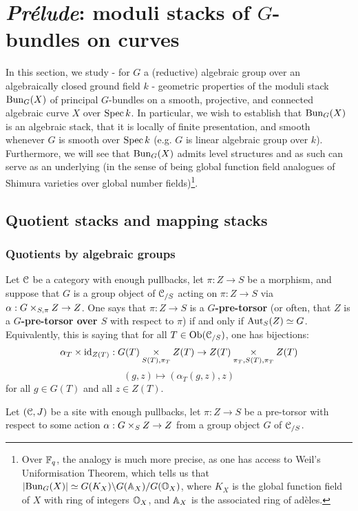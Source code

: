 \section{\textit{Pr\'elude}: moduli stacks of \texorpdfstring{$G$}{}-bundles on curves}
    In this section, we study - for $G$ a (reductive) algebraic group over an algebraically closed ground field $k$ - geometric properties of the moduli stack $\mathrm{Bun}_G(X)$ of principal $G$-bundles on a smooth, projective, and connected algebraic curve $X$ over $\operatorname{Spec} k$. In particular, we wish to establish that $\mathrm{Bun}_G(X)$ is an algebraic stack, that it is locally of finite presentation, and smooth whenever $G$ is smooth over $\operatorname{Spec} k$ (e.g. $G$ is linear algebraic group over $k$). Furthermore, we will see that $\mathrm{Bun}_G(X)$ admits level structures and as such can serve as an underlying  (in the sense of being global function field analogues of Shimura varieties over global number fields)\footnote{Over $\mathbb{F}_q$, the analogy is much more precise, as one has access to Weil's Uniformisation Theorem, which tells us that $|\mathrm{Bun}_G(X)| \simeq G(K_X)\backslash G(\mathbb{A}_X)/G(\mathbb{O}_{X})$, where $K_X$ is the global function field of $X$ with ring of integers $\mathbb{O}_X$, and $\mathbb{A}_X$ is the associated ring of ad\`eles.}. 
    
    \subsection{Quotient stacks and mapping stacks}
        \subsubsection{Quotients by algebraic groups}
            \begin{definition} \label{def: pre_torsors}
                Let $\mathcal{C}$ be a category with enough pullbacks, let $\pi: Z \to S$ be a morphism, and suppose that $G$ is a group object of $\mathcal{C}_{/S}$ acting on $\pi: Z \to S$ via $\alpha: G \x_{S, \pi} Z \to Z$. One says that $\pi: Z \to S$ is a \textbf{$G$-pre-torsor} (or often, that $Z$ is a \textbf{$G$-pre-torsor over $S$} with respect to $\pi$) if and only if $\mathrm{Aut}_S(Z) \simeq G$. Equivalently, this is saying that for all $T \in \mathrm{Ob}(\mathcal{C}_{/S})$, one has bijections:
                    $$\alpha_T \x \id_{Z(T)}: G(T) \x_{S(T), \pi_T} Z(T) \to Z(T) \x_{\pi_T, S(T), \pi_T} Z(T)$$
                    $$(g, z) \mapsto (\alpha_T(g, z), z)$$
                for all $g \in G(T)$ and all $z \in Z(T)$. 
            \end{definition}
            \begin{definition}[Torsors] \label{def: torsors}
                Let $(\mathcal{C}, J)$ be a site with enough pullbacks, let $\pi: Z \to S$ be a pre-torsor with respect to some action $\alpha: G \x_S Z \to Z$ from a group object $G$ of $\mathcal{C}_{/S}$. 
            \end{definition}
        
